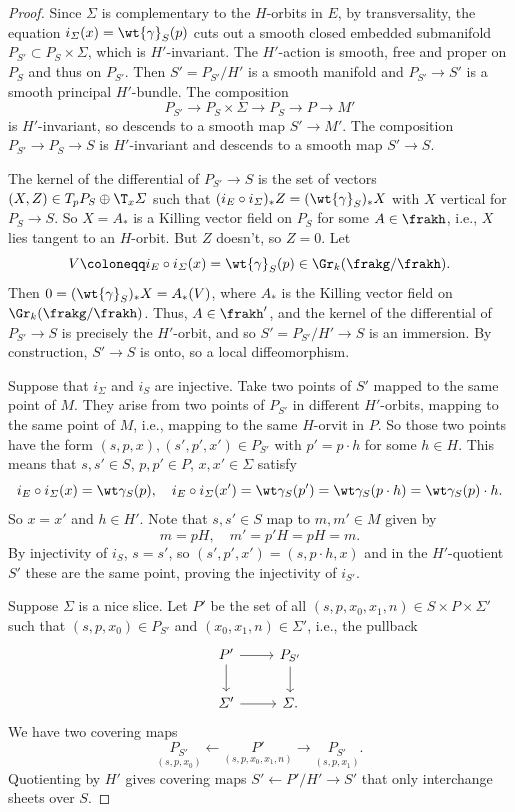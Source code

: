 \begin{proof}
    Since $\varSigma$ is complementary to the $H$-orbits in $E$, by transversality, the equation $i_\varSigma(x)=\wt{\gamma}_S(p)$ cuts out a smooth closed embedded submanifold $P_{S'}\subset P_S\times\varSigma$, which is $H'$-invariant. The $H'$-action is smooth, free and proper on $P_S$ and thus on $P_{S'}$. Then $S'=P_{S'}\slash H'$ is a smooth manifold and $P_{S'}\to S'$ is a smooth principal $H'$-bundle. The composition 
    \[P_{S'}\to P_S\times\varSigma\to P_S\to P\to M'\]
    is $H'$-invariant, so descends to a smooth map $S'\to M'$. The composition $P_{S'}\to P_S\to S$ is $H'$-invariant and descends to a smooth map $S'\to S$.

    The kernel of the differential of $P_{S'}\to S$ is the set of vectors $(X,Z)\in T_p P_S\oplus \T_x \varSigma$ such that $(i_E\circ i_\varSigma)_\ast Z=(\wt{\gamma}_S)_\ast X$ with $X$ vertical for $P_S\to S$. So $X=A_\ast$ is a Killing vector field on $P_S$ for some $A\in\frakh$, i.e., $X$ lies tangent to an $H$-orbit. But $Z$ doesn't, so $Z=0$. Let 
    \[V\coloneqq i_E\circ i_\varSigma(x)=\wt{\gamma}_S(p)\in\Gr_k(\frakg\slash\frakh).\] 
    Then $0=(\wt{\gamma}_S)_\ast X=A_\ast(V)$, where $A_\ast$ is the Killing vector field on $\Gr_k(\frakg\slash\frakh)$. Thus, $A\in\frakh'$, and the kernel of the differential of $P_{S'}\to S$ is precisely the $H'$-orbit, and so $S'=P_{S'}\slash H'\to S$ is an immersion. By construction, $S'\to S$ is onto, so a local diffeomorphism.

    Suppose that $i_\varSigma$ and $i_S$ are injective. Take two points of $S'$ mapped to the same point of $M$. They arise from two points of $P_{S'}$ in different $H'$-orbits, mapping to the same point of $M$, i.e., mapping to the same $H$-orvit in $P$. So those two points have the form $(s,p,x),(s',p',x')\in P_{S'}$ with $p'=p\cdot h$ for some $h\in H$. This means that $s,s'\in S$, $p,p'\in P$, $x,x'\in \varSigma$ satisfy 
    \[i_E\circ i_\varSigma(x)=\wt\gamma_S(p),\quad i_E\circ i_\varSigma(x')=\wt\gamma_S(p')=\wt\gamma_S(p\cdot h)=\wt\gamma_S(p)\cdot h.\]
    So $x=x'$ and $h\in H'$. Note that $s,s'\in S$ map to $m,m'\in M$ given by 
    \[m=pH,\quad m'=p'H=pH=m.\]
    By injectivity of $i_S$, $s=s'$, so $(s',p',x')=(s,p\cdot h,x)$ and in the $H'$-quotient $S'$ these are the same point, proving the injectivity of $i_{S'}$.

    Suppose $\varSigma$ is a nice slice. Let $P'$ be the set of all $(s,p,x_0,x_1,n)\in S\times P\times \varSigma'$ such that $(s,p,x_0)\in P_{S'}$ and $(x_0,x_1,n)\in \varSigma'$, i.e., the pullback 
    \[\begin{tikzcd}
        P'\arrow[r]\arrow[d] & P_{S'}\arrow[d]\\
        \varSigma' \arrow[r] & \varSigma.
    \end{tikzcd}\]
    We have two covering maps 
    \[\underset{(s,p,x_0)}{P_{S'}}\longleftarrow \underset{(s,p,x_0,x_1,n)}{P'}\longrightarrow \underset{(s,p,x_1)}{P_{S'}}.\]
    Quotienting by $H'$ gives covering maps $S'\leftarrow P'\slash H'\to S'$ that only interchange sheets over $S$.
\end{proof}

